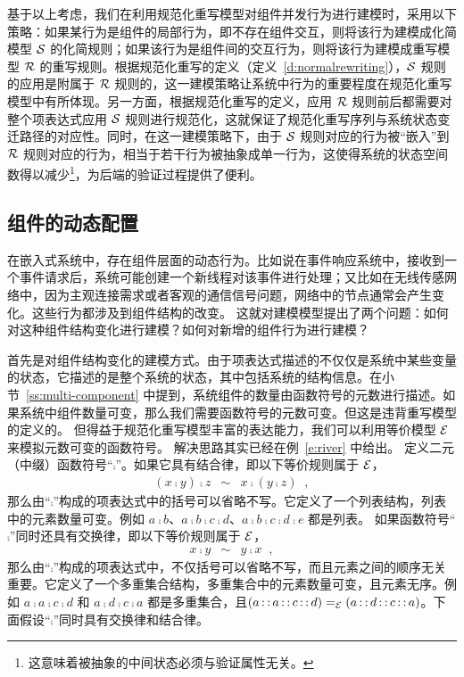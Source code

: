 基于以上考虑，我们在利用规范化重写模型对组件并发行为进行建模时，采用以下策略：如果某行为是组件的局部行为，即不存在组件交互，则将该行为建模成化简模型 $\mathcal{S}$ 的化简规则；如果该行为是组件间的交互行为，则将该行为建模成重写模型 $\mathcal{R}$ 的重写规则。根据规范化重写的定义（定义~\ref{d:normalrewriting}），$\mathcal{S}$ 规则的应用是附属于 $\mathcal{R}$ 规则的，这一建模策略让系统中行为的重要程度在规范化重写模型中有所体现。另一方面，根据规范化重写的定义，应用 $\mathcal{R}$ 规则前后都需要对整个项表达式应用 $\mathcal{S}$ 规则进行规范化，这就保证了规范化重写序列与系统状态变迁路径的对应性。同时，在这一建模策略下，由于 $\mathcal{S}$ 规则对应的行为被“嵌入”到 $\mathcal{R}$ 规则对应的行为，相当于若干行为被抽象成单一行为，这使得系统的状态空间数得以减少\footnote{这意味着被抽象的中间状态必须与验证属性无关。}，为后端的验证过程提供了便利。


\subsection{组件的动态配置}
\label{ss:dynamic-component}

在嵌入式系统中，存在组件层面的动态行为。比如说在事件响应系统中，接收到一个事件请求后，系统可能创建一个新线程对该事件进行处理；又比如在无线传感网络中，因为主观连接需求或者客观的通信信号问题，网络中的节点通常会产生变化。这些行为都涉及到组件结构的改变。
这就对建模模型提出了两个问题：如何对这种组件结构变化进行建模？如何对新增的组件行为进行建模？

首先是对组件结构变化的建模方式。由于项表达式描述的不仅仅是系统中某些变量的状态，它描述的是整个系统的状态，其中包括系统的结构信息。在小节~\ref{ss:multi-component} 中提到，系统组件的数量由函数符号的元数进行描述。如果系统中组件数量可变，那么我们需要函数符号的元数可变。但这是违背重写模型的定义的。 但得益于规范化重写模型丰富的表达能力，我们可以利用等价模型 $\mathcal{E}$ 来模拟元数可变的函数符号。
解决思路其实已经在例~\ref{e:river} 中给出。
定义二元（中缀）函数符号“$\comp$”。如果它具有结合律，即以下等价规则属于 $\mathcal{E}$，
\begin{eqnarray}
 (x\comp y) \comp z & \sim & x \comp (y\comp z)\;\; , \nonumber
\end{eqnarray}
那么由“$\comp$”构成的项表达式中的括号可以省略不写。它定义了一个列表结构，列表中的元素数量可变。例如 $a\comp b$、$a\comp b\comp c\comp d$、$a\comp b\comp c\comp d\comp e$ 都是列表。
如果函数符号“$\comp$”同时还具有交换律，即以下等价规则属于 $\mathcal{E}$，
\begin{eqnarray}
 x\comp y & \sim & y\comp x\;\; , \nonumber
\end{eqnarray}
那么由“$\comp$”构成的项表达式中，不仅括号可以省略不写，而且元素之间的顺序无关重要。它定义了一个多重集合结构，多重集合中的元素数量可变，且元素无序。例如 $a\comp a\comp c\comp d$ 和 $a\comp d\comp c\comp a$ 都是多重集合，且$(a\operatorname{\mathsf{::}} a\operatorname{\mathsf{::}} c\operatorname{\mathsf{::}} d) =_{\mathcal{E}} (a\operatorname{\mathsf{::}} d\operatorname{\mathsf{::}} c\operatorname{\mathsf{::}} a)$。下面假设“$\comp$”同时具有交换律和结合律。

